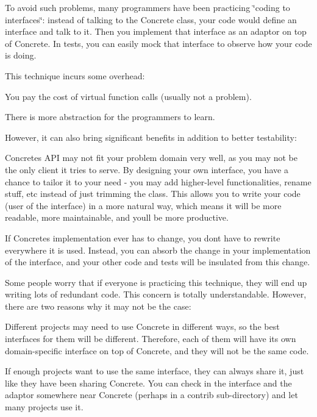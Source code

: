 To avoid such problems, many programmers have been practicing \char`\"{}coding to
interfaces\char`\"{}\+: instead of talking to the {\ttfamily Concrete} class, your code would define an interface and talk to it. Then you implement that interface as an adaptor on top of {\ttfamily Concrete}. In tests, you can easily mock that interface to observe how your code is doing.

This technique incurs some overhead\+:


\begin{DoxyItemize}
\item You pay the cost of virtual function calls (usually not a problem).
\item There is more abstraction for the programmers to learn.
\end{DoxyItemize}

However, it can also bring significant benefits in addition to better testability\+:


\begin{DoxyItemize}
\item {\ttfamily Concrete}\textquotesingle{}s A\+PI may not fit your problem domain very well, as you may not be the only client it tries to serve. By designing your own interface, you have a chance to tailor it to your need -\/ you may add higher-\/level functionalities, rename stuff, etc instead of just trimming the class. This allows you to write your code (user of the interface) in a more natural way, which means it will be more readable, more maintainable, and you\textquotesingle{}ll be more productive.
\item If {\ttfamily Concrete}\textquotesingle{}s implementation ever has to change, you don\textquotesingle{}t have to rewrite everywhere it is used. Instead, you can absorb the change in your implementation of the interface, and your other code and tests will be insulated from this change.
\end{DoxyItemize}

Some people worry that if everyone is practicing this technique, they will end up writing lots of redundant code. This concern is totally understandable. However, there are two reasons why it may not be the case\+:


\begin{DoxyItemize}
\item Different projects may need to use {\ttfamily Concrete} in different ways, so the best interfaces for them will be different. Therefore, each of them will have its own domain-\/specific interface on top of {\ttfamily Concrete}, and they will not be the same code.
\item If enough projects want to use the same interface, they can always share it, just like they have been sharing {\ttfamily Concrete}. You can check in the interface and the adaptor somewhere near {\ttfamily Concrete} (perhaps in a {\ttfamily contrib} sub-\/directory) and let many projects use it.
\end{DoxyItemize}

